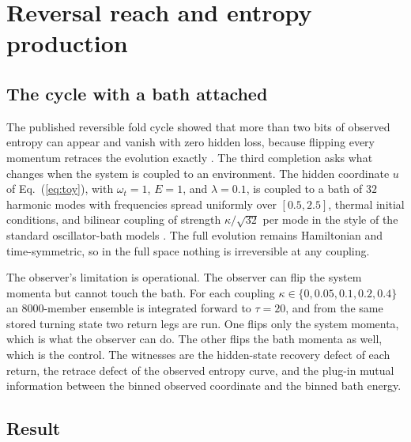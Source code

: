 \documentclass[aps,pre,reprint,nofootinbib]{revtex4-2}
\begin{document}
\section{Reversal reach and entropy production}
\label{sec:pe4}

\subsection{The cycle with a bath attached}

The published reversible fold cycle showed that more than two bits of
observed entropy can appear and vanish with zero hidden loss, because
flipping every momentum retraces the evolution exactly
\cite{EntropyPaper}.  The third completion asks what changes when the
system is coupled to an environment.  The hidden coordinate $u$ of
Eq.~(\ref{eq:toy}), with $\omega_t = 1$, $E = 1$, and $\lambda = 0.1$, is
coupled to a bath of $32$ harmonic modes with frequencies spread uniformly
over $[0.5, 2.5]$, thermal initial conditions, and bilinear coupling of
strength $\kappa/\sqrt{32}$ per mode in the style of the standard
oscillator-bath models \cite{CaldeiraLeggett1983}.  The full evolution
remains Hamiltonian and time-symmetric, so in the full space nothing is
irreversible at any coupling.

The observer's limitation is operational.  The observer can flip the
system momenta but cannot touch the bath.  For each coupling
$\kappa \in \{0, 0.05, 0.1, 0.2, 0.4\}$ an $8000$-member ensemble is
integrated forward to $\tau = 20$, and from the same stored turning state
two return legs are run.  One flips only the system momenta, which is
what the observer can do.  The other flips the bath momenta as well,
which is the control.  The witnesses are the hidden-state recovery defect
of each return, the retrace defect of the observed entropy curve, and the
plug-in mutual information between the binned observed coordinate and the
binned bath energy.

\subsection{Result}
\end{document}
